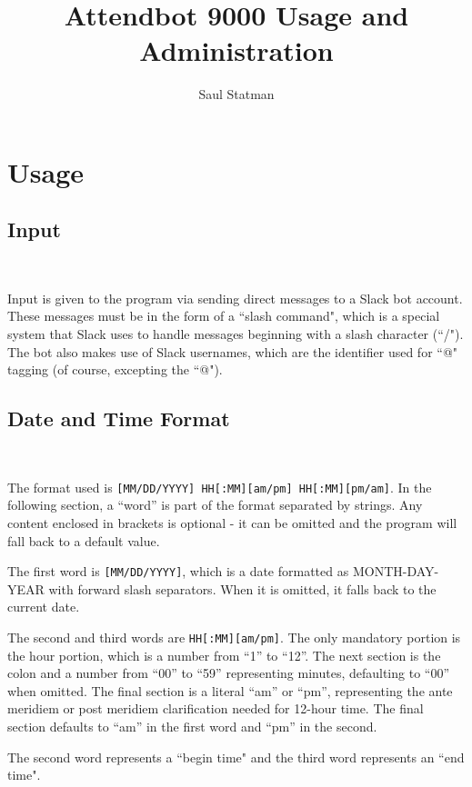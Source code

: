 \documentclass{article}
\begin{document}
\title{Attendbot 9000 Usage and Administration}

\author{Saul Statman}

\maketitle

\section{Usage}

\subsection{Input}

\

Input is given to the program via sending direct messages to a Slack bot account. These messages must be in the form of a ``slash command", which is a special system that Slack uses to handle messages beginning with a slash character (``/"). The bot also makes use of Slack usernames, which are the identifier used for ``@" tagging (of course, excepting the ``@").

\subsection{Date and Time Format}

\

The format used is \texttt{[MM/DD/YYYY] HH[:MM][am/pm] HH[:MM][pm/am]}. In the following section, a ``word'' is part of the format separated by strings. Any content enclosed in brackets is optional - it can be omitted and the program will fall back to a default value.

The first word is \texttt{[MM/DD/YYYY]}, which is a date formatted as MONTH-DAY-YEAR with forward slash separators. When it is omitted, it falls back to the current date.

The second and third words are \texttt{HH[:MM][am/pm]}. The only mandatory portion is the hour portion, which is a number from ``1'' to ``12''. The next section is the colon and a number from ``00'' to ``59'' representing minutes, defaulting to ``00'' when omitted. The final section is a literal ``am'' or ``pm'', representing the ante meridiem or post meridiem clarification needed for 12-hour time. The final section defaults to ``am'' in the first word and ``pm'' in the second.

The second word represents a ``begin time" and the third word represents an ``end time".
\end{document}
